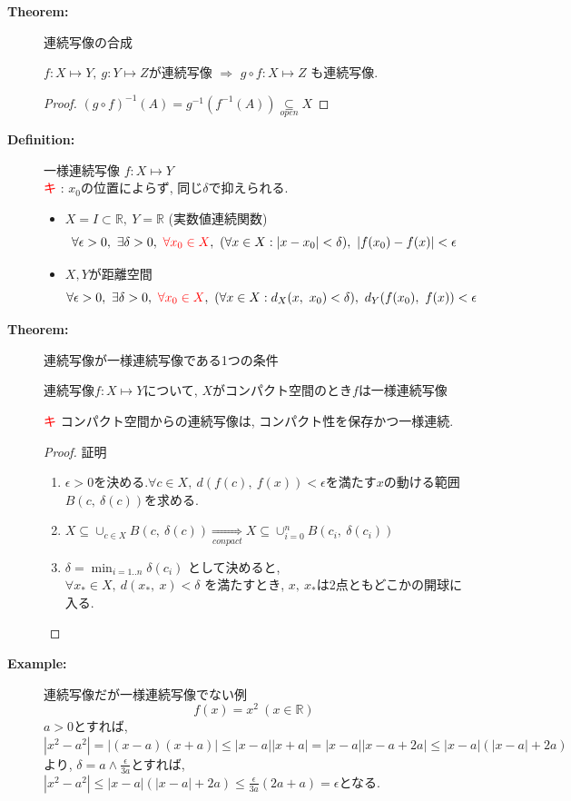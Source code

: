 \documentclass[dvipdfmx]{jsarticle}
\newcommand{\point}{\textcircled{\textcolor{red}{\scriptsize キ}} }
\begin{document}
\begin{description}
    \item[\bf{Theorem:}] 連続写像の合成
        \begin{center}$f: X \mapsto Y,\ g: Y \mapsto Z$が連続写像 $\Rightarrow$ $g \circ f : X \mapsto Z$ も連続写像. \end{center}
        \begin{proof}
            $(g \circ f)^{-1}(A) = g^{-1}(f^{-1}(A)) \underset{open}{\subseteq} X$
        \end{proof}
    
    \item[\bf{Definition:}] 一様連続写像 $f : X \mapsto Y$ \\
        \point : $x_0$の位置によらず, 同じ$\delta$で抑えられる.
        \begin{itemize}
            \item $X = I \subset \mathbb{R},\ Y = \mathbb{R}$ (実数値連続関数)
                $$ \forall \epsilon > 0,\ \exists \delta > 0,\ { \color{red} \forall x_0 \in X},\ ( \forall x \in X : |x - x_0 | < \delta),\ | f(x_0) - f(x) | < \epsilon $$
            \item $X, Y$が距離空間
            $$ \forall \epsilon > 0,\ \exists \delta > 0,\ { \color{red} \forall x_0 \in X},\ ( \forall x \in X : d_X(x,\ x_0) < \delta),\ d_Y(f(x_0),\ f(x) ) < \epsilon $$
        \end{itemize}
    
    \item[\bf{Theorem:}] 連続写像が一様連続写像である1つの条件
        \begin{center} 連続写像$f : X \mapsto Y$について, $X$がコンパクト空間のとき$f$は一様連続写像 \end{center}
        \point コンパクト空間からの連続写像は, コンパクト性を保存かつ一様連続. \\
        \begin{proof} 証明
            \begin{enumerate}
                \item $\epsilon > 0$を決める.$\forall c \in X,\ d(f(c),\ f(x)) < \epsilon$を満たす$x$の動ける範囲$B(c,\ \delta(c))$を求める.
                \item $ X \subseteq \cup_{c \in X} B(c,\ \delta(c)) \underset{conpact}{\Rightarrow} X \subseteq \cup_{i = 0}^{n} B(c_i,\ \delta(c_i))$
                \item $\delta = \min_{i=1 .. n} \delta(c_i)$ として決めると, \\
                $\forall x_* \in X,\ d( x_*,\ x) < \delta $ を満たすとき, $x,\ x_*$は2点ともどこかの開球に入る.
            \end{enumerate}
        \end{proof}
    \item[\bf{Example:}] 連続写像だが一様連続写像でない例
        $$ f(x) = x^2 \ ( x \in \mathbb{R}) $$
        $a > 0$とすれば, 
        $ | x^2 - a^2 | = | (x-a) (x+a) | \leq | x - a || x + a| = |x-a||x-a+2a| \leq |x-a|(|x-a|+2a)$ より, $\delta = a \wedge \frac{\epsilon}{3a} $とすれば, 
        $ | x^2 - a^2 | \leq |x-a|(|x-a|+2a) \leq \frac{\epsilon}{3a}(2a + a) = \epsilon $となる.


\end{description}
\end{document}

